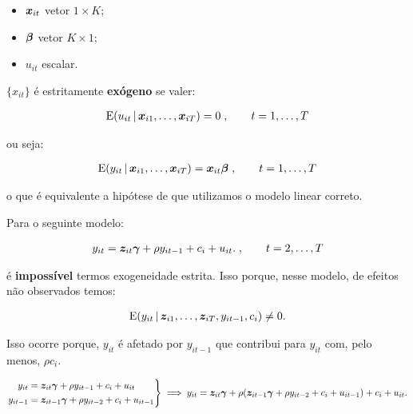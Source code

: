 \documentclass[11pt, oneside, a4paper, article]{article}
\numberwithin{equation}{section}
\begin{document}
\begin{description}
\begin{description}
\begin{itemize}
\item
$\boldsymbol{x}_{it}$  vetor $1 \times K$;

\item
$\boldsymbol{\beta}$ vetor $K \times 1$;

\item
$u_{it}$ escalar.
\end{itemize}

\noindent
$\{x_{it}\}$ é estritamente \textbf{exógeno} se valer:

\vspace{-1 em}
\begin{align*}
	\text{E}( u_{it} \, | \, \boldsymbol{x}_{i1}, \dots, \boldsymbol{x}_{iT} ) = 0 \; , \qquad t = 1, \dots, T
\end{align*}

\noindent
ou seja:

\vspace{-1 em}
\begin{align*}
\text{E}( y_{it} \, | \, \boldsymbol{x}_{i1}, \dots, \boldsymbol{x}_{iT} ) = \boldsymbol{x}_{it} \boldsymbol{\beta} 
\; , \qquad t = 1, \dots, T
\end{align*}

\noindent
o que é equivalente a hipótese de que utilizamos o modelo linear correto.

Para o seguinte modelo:

\vspace{-1.5 em}
\begin{align*}
y_{it} = \boldsymbol{z}_{it} \boldsymbol{\gamma} + \rho y_{i t - 1} + c_{i} + u_{it}.
\; , \qquad t = 2, \dots, T
\end{align*}

\noindent
é \textbf{impossível} termos exogeneidade estrita.
Isso porque, nesse modelo, de efeitos não observados temos:

\vspace{-1.5 em}
\begin{align*}
	\text{E}( y_{it} \, | \, \boldsymbol{z}_{i1}, \dots, \boldsymbol{z}_{iT}, y_{it-1}, c_{i}) \neq 0.
\end{align*}

\noindent
Isso ocorre porque, $y_{it}$ é afetado por $y_{it-1}$ que contribui para $y_{it}$ com, pelo menos, $\rho c_{i}$.

\begin{equation*}
\left.
\begin{aligned}
y_{it} &= \boldsymbol{z}_{it} \boldsymbol{\gamma} + \rho y_{i t - 1} + c_{i} + u_{it}
\\
y_{it-1} &= \boldsymbol{z}_{it-1} \boldsymbol{\gamma} + \rho y_{i t - 2} + c_{i} + u_{it-1}
\end{aligned}
\right\} 
\implies
y_{it} = \boldsymbol{z}_{it} \boldsymbol{\gamma} +
\rho (\boldsymbol{z}_{it-1} \boldsymbol{\gamma} + \rho y_{i t - 2} + c_{i} + u_{it-1})
+ c_{i} + u_{it}.
\end{equation*}


\end{description}
\end{description}
\end{document}
